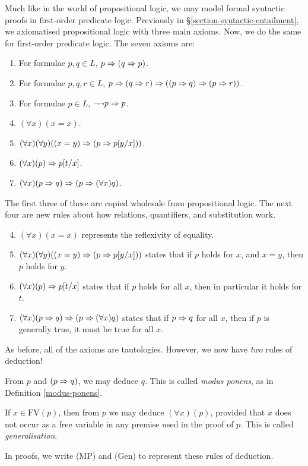 \documentclass{article}
\begin{document}
Much like in the world of propositional logic, we may model formal syntactic proofs in first-order predicate logic. Previously in \S\ref{section-syntactic-entailment}, we axiomatised propositional logic with three main axioms. Now, we do the same for first-order predicate logic. The seven axioms are:
\begin{enumerate}
    \item For formulae $p, q \in L$, $p \Rightarrow (q \Rightarrow p)$.
    \item For formulae $p, q, r \in L$, $p \Rightarrow (q \Rightarrow r) \Rightarrow ((p \Rightarrow q) \Rightarrow (p \Rightarrow r))$.
    \item For formulae $p \in L$, $\lnot \lnot p \Rightarrow p$.
    \item $(\forall x)(x = x)$.
    \item $(\forall x)(\forall y)((x = y) \Rightarrow (p \Rightarrow p[y/x]))$.
    \item $(\forall x)(p) \Rightarrow p[t/x]$.
    \item $(\forall x)(p \Rightarrow q) \Rightarrow (p \Rightarrow (\forall x) q)$.
\end{enumerate}
The first three of these are copied wholesale from propositional logic. The next four are new rules about how relations, quantifiers, and substitution work.
\begin{enumerate}
	\setcounter{enumi}{3}
    \item $(\forall x)(x = x)$ represents the reflexivity of equality.
    \item $(\forall x)(\forall y)((x = y) \Rightarrow (p \Rightarrow p[y/x]))$ states that if $p$ holds for $x$, and $x = y$, then $p$ holds for $y$.
    \item $(\forall x)(p) \Rightarrow p[t/x]$ states that if $p$ holds for all $x$, then in particular it holds for $t$.
    \item $(\forall x)(p \Rightarrow q) \Rightarrow (p \Rightarrow (\forall x) q)$ states that if $p \Rightarrow q$ for all $x$, then if $p$ is generally true, it must be true for all $x$.
\end{enumerate}
As before, all of the axioms are tautologies. However, we now have \textit{two} rules of deduction!

\begin{definition}
	\label{deduction-rules}
    From $p$ and $(p \Rightarrow q)$, we may deduce $q$. This is called \textit{modus ponens}, as in Definition \ref{modus-ponens}.
    
    If $x \in \mathrm{FV}(p)$, then from $p$ we may deduce $(\forall x)(p)$, provided that $x$ does not occur as a free variable in any premise used in the proof of $p$. This is called \textit{generalisation}.
    
    In proofs, we write (MP) and (Gen) to represent these rules of deduction.
\end{definition}
\end{document}

